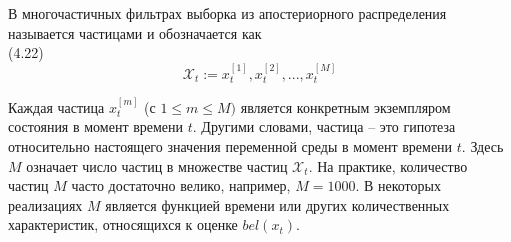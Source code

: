 \documentclass[10pt,a4paper]{article}
\begin{document}
В многочастичных фильтрах выборка из апостериорного распределения называется частицами
и обозначается как\\

(4.22)
$$\mathcal X_t:=x_t^{[1]},x_t^{[2]},...,x_t^{[M]}$$

Каждая частица $x_t^{[m]}$ (с $1\leq m\leq M)$ является конкретным экземпляром состояния в момент времени $t$. Другими словами, частица – это гипотеза относительно настоящего значения переменной среды в момент времени $t$. Здесь $M$ означает число частиц в множестве частиц $\mathcal X_t$. На практике, количество частиц $M$ часто достаточно велико, например, $M = 1000$. В некоторых реализациях $M$ является функцией времени или других количественных характеристик, относящихся к оценке $bel(x_t)$.\\
\end{document}
